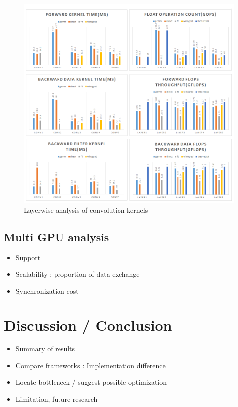 \begin{figure}
  \centering
  \includegraphics[width=\linewidth]{./figures/layerwise_bench}
  \caption{Layerwise analysis of convolution kernels}
  \label{fig_layerwise}
\end{figure}


\subsection{Multi GPU analysis}

\begin{itemize}
  \item Support
  \item Scalability : proportion of data exchange
  \item Synchronization cost
\end{itemize}

\section{Discussion / Conclusion}

\begin{itemize}
  \item Summary of results
  \item Compare frameworks : Implementation difference
  \item Locate bottleneck / suggest possible optimization
  \item Limitation, future research
\end{itemize}
